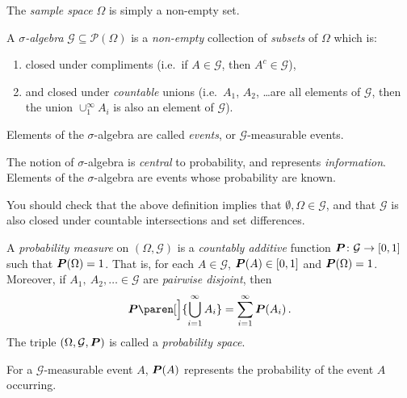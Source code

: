 \begin{definition}
  The \emph{sample space} $\Omega$ is simply a non-empty set.
\end{definition}

\begin{definition}
  A \emph{$\sigma$-algebra} $\mathcal G \subseteq \mathcal P(\Omega)$ is a \emph{non-empty} collection of \emph{subsets} of $\Omega$ which is:
  \begin{enumerate}
    \item closed under compliments (i.e.\ if $A \in \mathcal G$, then $A^c \in \mathcal G$),
    \item and closed under \emph{countable} unions (i.e.\ $A_1$, $A_2$, \dots are all elements of $\mathcal G$, then the union $\cup_1^\infty A_i$ is also an element of $\mathcal G$).
  \end{enumerate}
  Elements of the $\sigma$-algebra are called \emph{events}, or $\mathcal G$-measurable events.
\end{definition}

\begin{remark}
  The notion of $\sigma$-algebra is \emph{central} to probability, and represents \emph{information}.
  Elements of the $\sigma$-algebra are events whose probability are known.
\end{remark}

\begin{remark}
  You should check that the above definition implies that $\emptyset, \Omega \in \mathcal G$, and that $\mathcal G$ is also closed under countable intersections and set differences.
\end{remark}

\begin{definition}
  A \emph{probability measure} on $(\Omega, \mathcal G)$ is a \emph{countably additive} function $\P\colon \mathcal G \to [0, 1]$ such that $\P(\Omega) = 1$.
  That is, for each $A \in \mathcal G$, $\P(A) \in [0, 1]$ and $\P(\Omega) = 1$.
  Moreover, if $A_1,\ A_2, \dots \in \mathcal G$ are \emph{pairwise disjoint}, then
  \begin{equation*}
    \P\paren[\Big]{ \bigcup_{i = 1}^\infty A_i } = \sum_{i=1}^\infty \P(A_i)\,.
  \end{equation*}
  The triple $(\Omega, \mathcal G, \P)$ is called a \emph{probability space}.
\end{definition}

\begin{remark}
For a $\mathcal G$-measurable event $A$, $\P(A)$ represents the probability of the event $A$ occurring.
\end{remark}

